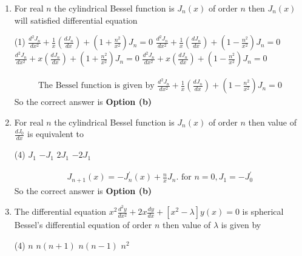 \begin{enumerate}[label=\color{ocre}\textbf{\arabic*.}]
\item For real $n$ the cylindrical Bessel function is $J_{n}(x)$ of order $n$ then $J_{n}(x)$ will satisfied differential equation
 \begin{tasks}(1)
	\task[\textbf{a.}]$\frac{d^{2} J_{n}}{d x^{2}}+\frac{1}{x}\left(\frac{d J_{n}}{d x}\right)+\left(1+\frac{n^{2}}{x^{2}}\right) J_{n}=0$
	\task[\textbf{b.}] $\frac{d^{2} J_{n}}{d x^{2}}+\frac{1}{x}\left(\frac{d J_{n}}{d x}\right)+\left(1-\frac{n^{2}}{x^{2}}\right) J_{n}=0$
	\task[\textbf{c.}] $\frac{d^{2} J_{n}}{d x^{2}}+x\left(\frac{d J_{n}}{d x}\right)+\left(1+\frac{n^{2}}{x^{2}}\right) J_{n}=0$
	\task[\textbf{d.}] $\frac{d^{2} J_{n}}{d x^{2}}+x\left(\frac{d J_{n}}{d x}\right)+\left(1-\frac{n^{2}}{x^{2}}\right) J_{n}=0$
\end{tasks}
\begin{answer}
	\begin{align*}
\text{The Bessel function is given by }\frac{d^{2} J_{n}}{d x^{2}}+\frac{1}{x}\left(\frac{d J_{n}}{d x}\right)+\left(1-\frac{n^{2}}{x^{2}}\right) J_{n}=0
	\end{align*}
		So the correct answer is \textbf{Option (b)}
\end{answer}
\item For real $n$ the cylindrical Bessel function is $J_{n}(x)$ of order $n$ then value of $\frac{d J_{0}}{d x}$ is equivalent to 
 \begin{tasks}(4)
	\task[\textbf{a.}] $J_{1}$
	\task[\textbf{b.}]$-J_{1}$
	\task[\textbf{c.}]$2 J_{1}$
	\task[\textbf{d.}]$-2 J_{1}$
\end{tasks}
\begin{answer}
	\begin{align*}
J_{n+1}(x)=-J_{n}^{\prime}(x)+\frac{n}{x} J_{n}\text{. for }n=0, J_{1}=-J_{0}^{\prime}
	\end{align*}
		So the correct answer is \textbf{Option (b)}
\end{answer}
\item  The differential equation $x^{2} \frac{d^{2} y}{d x^{2}}+2 x \frac{d y}{d x}+\left[x^{2}-\lambda\right] y(x)=0$ is spherical Bessel's differential equation of order $n$ then value of $\lambda$ is given by
 \begin{tasks}(4)
	\task[\textbf{a.}]$n$
	\task[\textbf{b.}]$n(n+1)$
	\task[\textbf{c.}] $n(n-1)$
	\task[\textbf{d.}]  $n^{2}$
\end{tasks}
\begin{answer}
	\begin{align*}

\end{align*}
\end{answer}
\end{enumerate}
